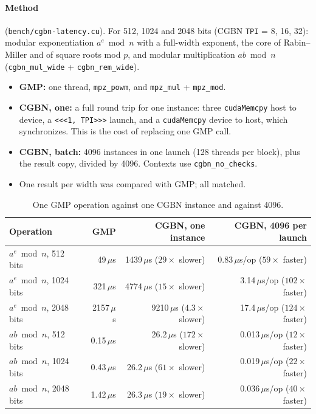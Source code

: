 \documentclass[11pt,a4paper]{article}
\newcommand{\code}[1]{\texttt{#1}}
\newcommand{\us}{\,$\mu$s}
\begin{document}
\paragraph{Method} (\code{bench/cgbn-latency.cu}). For 512, 1024 and 2048
bits (CGBN \code{TPI} = 8, 16, 32): modular exponentiation $a^e \bmod n$
with a full-width exponent, the core of Rabin--Miller and of square roots
mod $p$, and modular multiplication $ab \bmod n$ (\code{cgbn\_mul\_wide}
+ \code{cgbn\_rem\_wide}).
\begin{itemize}
  \item \textbf{GMP:} one thread, \code{mpz\_powm}, and \code{mpz\_mul} +
    \code{mpz\_mod}.
  \item \textbf{CGBN, one:} a full round trip for one instance: three
    \code{cudaMemcpy} host to device, a \code{<<<1, TPI>>>} launch, and a
    \code{cudaMemcpy} device to host, which synchronizes. This is the cost
    of replacing one GMP call.
  \item \textbf{CGBN, batch:} 4096 instances in one launch (128 threads
    per block), plus the result copy, divided by 4096. Contexts use
    \code{cgbn\_no\_checks}.
  \item One result per width was compared with GMP; all matched.
\end{itemize}

\begin{table}[ht]
\centering
\begin{tabular}{lrrr}
\toprule
Operation & GMP & CGBN, one instance & CGBN, 4096 per launch \\
\midrule
$a^e \bmod n$, 512 bits  & 49\us   & 1439\us{} ($29\times$ slower) & 0.83\us/op ($59\times$ faster) \\
$a^e \bmod n$, 1024 bits & 321\us  & 4774\us{} ($15\times$ slower) & 3.14\us/op ($102\times$ faster) \\
$a^e \bmod n$, 2048 bits & 2157\us & 9210\us{} ($4.3\times$ slower) & 17.4\us/op ($124\times$ faster) \\
$ab \bmod n$, 512 bits   & 0.15\us & 26.2\us{} ($172\times$ slower) & 0.013\us/op ($12\times$ faster) \\
$ab \bmod n$, 1024 bits  & 0.43\us & 26.2\us{} ($61\times$ slower) & 0.019\us/op ($22\times$ faster) \\
$ab \bmod n$, 2048 bits  & 1.42\us & 26.3\us{} ($19\times$ slower) & 0.036\us/op ($40\times$ faster) \\
\bottomrule
\end{tabular}
\caption{One GMP operation against one CGBN instance and against 4096.}
\label{tab:lat}
\end{table}
\end{document}
